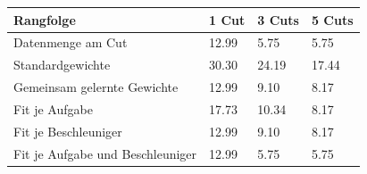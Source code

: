 \begin{tabular}{@{}llll@{}}
\toprule
Rangfolge & 1 Cut & 3 Cuts & 5 Cuts \\
\midrule
Datenmenge am Cut & 12.99 & 5.75 & 5.75 \\
Standardgewichte & 30.30 & 24.19 & 17.44 \\
Gemeinsam gelernte Gewichte & 12.99 & 9.10 & 8.17 \\
Fit je Aufgabe & 17.73 & 10.34 & 8.17 \\
Fit je Beschleuniger & 12.99 & 9.10 & 8.17 \\
Fit je Aufgabe und Beschleuniger & 12.99 & 5.75 & 5.75 \\
\bottomrule
\end{tabular}
